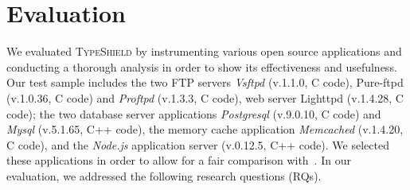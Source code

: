 \section{Evaluation}
\label{chapter:Evaluation}
We evaluated \textsc{TypeShield} by instrumenting various open source applications and 
conducting a thorough analysis in order to show its effectiveness and usefulness. 
Our test sample includes the two 
FTP servers \textit{Vsftpd} (v.1.1.0, C code), Pure-ftpd (v.1.0.36, C code) and 
\textit{Proftpd} (v.1.3.3, C code), 
web server Lighttpd (v.1.4.28, C code); 
the two database server applications 
\textit{Postgresql} (v.9.0.10, C code) and 
\textit{Mysql} (v.5.1.65, C++ code), 
the memory cache application 
\textit{Memcached} (v.1.4.20, C code), and 
the \textit{Node.js} application server (v.0.12.5, C++ code). 
We selected these applications in order to allow for a fair 
comparison with~\cite{veen:typearmor}. 
In our evaluation, we addressed the following research questions (RQs).
% 
% 
% 
% 
% 
%  
